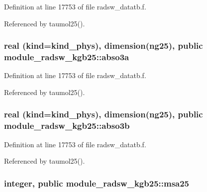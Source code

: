 Definition at line 17753 of file radsw\+\_\+datatb.\+f.



Referenced by taumol25().

\subsubsection[{\texorpdfstring{abso3a}{abso3a}}]{\setlength{\rightskip}{0pt plus 5cm}real (kind=kind\+\_\+phys), dimension(ng25), public module\+\_\+radsw\+\_\+kgb25\+::abso3a}\hypertarget{namespacemodule__radsw__kgb25_ab02765dac8ca71a439cdaf1ed2691851}{}\label{namespacemodule__radsw__kgb25_ab02765dac8ca71a439cdaf1ed2691851}


Definition at line 17753 of file radsw\+\_\+datatb.\+f.



Referenced by taumol25().

\subsubsection[{\texorpdfstring{abso3b}{abso3b}}]{\setlength{\rightskip}{0pt plus 5cm}real (kind=kind\+\_\+phys), dimension(ng25), public module\+\_\+radsw\+\_\+kgb25\+::abso3b}\hypertarget{namespacemodule__radsw__kgb25_a2844cade392c8805b1d418bc1260b3a5}{}\label{namespacemodule__radsw__kgb25_a2844cade392c8805b1d418bc1260b3a5}


Definition at line 17753 of file radsw\+\_\+datatb.\+f.



Referenced by taumol25().

\subsubsection[{\texorpdfstring{msa25}{msa25}}]{\setlength{\rightskip}{0pt plus 5cm}integer, public module\+\_\+radsw\+\_\+kgb25\+::msa25}\hypertarget{namespacemodule__radsw__kgb25_afc06df1f3c3a0b2f3189424ed042973e}{}\label{namespacemodule__radsw__kgb25_afc06df1f3c3a0b2f3189424ed042973e}


